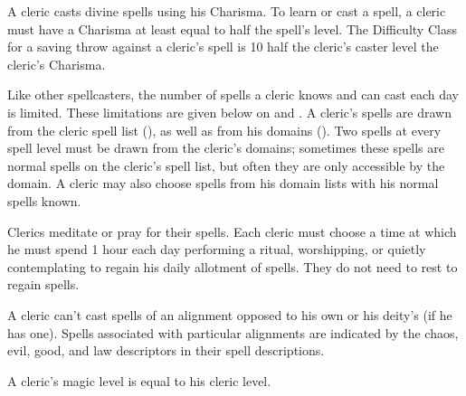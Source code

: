  A cleric casts divine spells using his Charisma. To learn or cast a spell, a cleric must have a Charisma at least equal to half the spell's level. The Difficulty Class for a saving throw against a cleric's spell is 10 \add half the cleric's caster level \add the cleric's Charisma.

Like other spellcasters, the number of spells a cleric knows and can cast each day is limited. These limitations are given below on  and . A cleric's spells are drawn from the cleric spell list (), as well as from his domains (). Two spells at every spell level must be drawn from the cleric's domains; sometimes these spells are normal spells on the cleric's spell list, but often they are only accessible by the domain. A cleric may also choose spells from his domain lists with his normal spells known.

Clerics meditate or pray for their spells. Each cleric must choose a time at which he must spend 1 hour each day performing a ritual, worshipping, or quietly contemplating to regain his daily allotment of spells. They do not need to rest to regain spells.

A cleric can't cast spells of an alignment opposed to his own or his deity's (if he has one). Spells associated with particular alignments are indicated by the chaos, evil, good, and law descriptors in their spell descriptions.

A cleric's magic level is equal to his cleric level.

